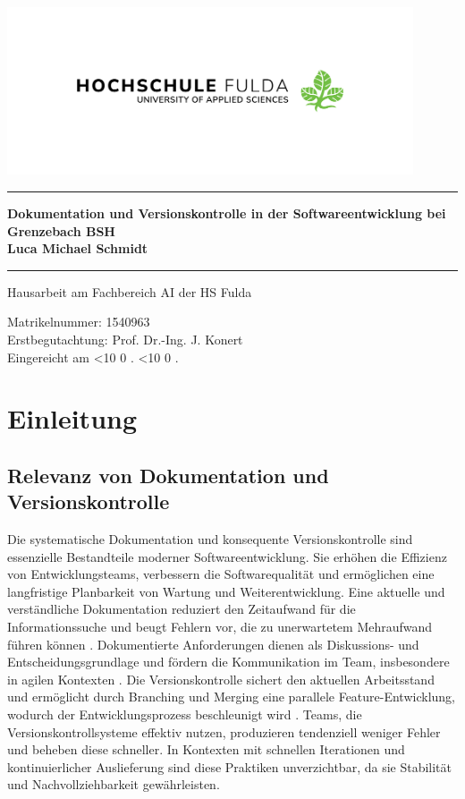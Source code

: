 \documentclass[12pt,oneside]{article}
\newcommand{\todayddmmyyyy}{%
    \ifnum
        \day<10 0
    \fi\the\day.%
    \ifnum
        \month<10 0
    \fi\the\month.%
    \the\year}
\newcommand{\HSFTitle}[8]{

    \thispagestyle{empty}
    \begin{center}
    \includegraphics[width=0.9\textwidth]{logo_new_2.png} \\
    \vspace*{\stretch{1}}
    \end{center}

    {\parindent0cm
    \rule{\linewidth}{.7ex}}
    \begin{center}
    \vspace*{\stretch{1}}
    \sffamily\bfseries\Huge
    #1\\
    \vspace*{\stretch{1}}
    \sffamily\bfseries\large
    #3
    \vspace*{\stretch{1}}
    \end{center}
    \rule{\linewidth}{.7ex}

    \vspace*{\stretch{2}}
    \begin{center}
    \Large #2 am #5 der HS Fulda \\
    \vspace*{\stretch{1}}

    \large Matrikelnummer: #4 \\[1mm]
    \large Erstbegutachtung: #7 \\[1mm]

    \vspace*{\stretch{1}}
    \large Eingereicht am #6
    \end{center}
}
\begin{document}
    \HSFTitle
    {Dokumentation und Versionskontrolle in der Softwareentwicklung bei Grenzebach BSH}        %
    {Hausarbeit} %
    {Luca Michael Schmidt}          %
    {1540963}
    {Fachbereich AI}  %
    {\todayddmmyyyy}        %
    {Prof. Dr.-Ing. J. Konert}     %

    \clearpage

    \lhead{}
    \setcounter{page}{1}

    

    \clearpage
    \tableofcontents
    \clearpage


    \cleardoublepage
    \setcounter{page}{1}
    \lhead{\nouppercase{\leftmark}}




    \section{Einleitung}
    \label{sec:einleitung}

    \subsection{Relevanz von Dokumentation und Versionskontrolle}
    \label{subsec:relevanz}
    Die systematische Dokumentation und konsequente Versionskontrolle sind essenzielle Bestandteile moderner Softwareentwicklung. Sie erhöhen die Effizienz von Entwicklungsteams, verbessern die Softwarequalität und ermöglichen eine langfristige Planbarkeit von Wartung und Weiterentwicklung.
    Eine aktuelle und verständliche Dokumentation reduziert den Zeitaufwand für die Informationssuche und beugt Fehlern vor, die zu unerwartetem Mehraufwand führen können \cite{webmakers2024}.
    Dokumentierte Anforderungen dienen als Diskussions- und Entscheidungsgrundlage und fördern die Kommunikation im Team, insbesondere in agilen Kontexten \cite{fraunhoferIESE2020}.
    Die Versionskontrolle sichert den aktuellen Arbeitsstand und ermöglicht durch Branching und Merging eine parallele Feature-Entwicklung, wodurch der Entwicklungsprozess beschleunigt wird \cite{moldstud2024}.
    Teams, die Versionskontrollsysteme effektiv nutzen, produzieren tendenziell weniger Fehler und beheben diese schneller.
    In Kontexten mit schnellen Iterationen und kontinuierlicher Auslieferung sind diese Praktiken unverzichtbar, da sie Stabilität und Nachvollziehbarkeit gewährleisten.
\end{document}
